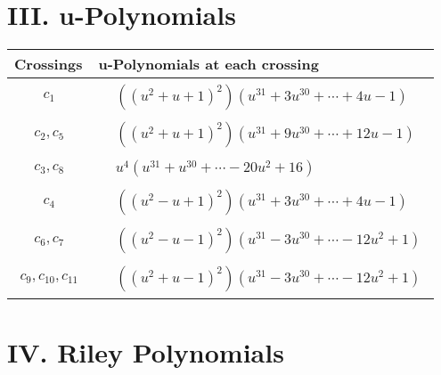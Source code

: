 \documentclass[1p]{elsarticle_modified}
\theoremstyle{definition}
\begin{document}
\newpage\renewcommand{\arraystretch}{1}
\centering \section*{ III. u-Polynomials}
\begin{tabular}{m{50pt}|m{274pt}}
Crossings & \hspace{64pt}u-Polynomials at each crossing \\
\hline $$\begin{aligned}c_{1}\end{aligned}$$&$\begin{aligned}
&((u^2+u+1)^2)(u^{31}+3 u^{30}+\cdots+4 u-1)
\end{aligned}$\\
\hline $$\begin{aligned}c_{2},c_{5}\end{aligned}$$&$\begin{aligned}
&((u^2+u+1)^2)(u^{31}+9 u^{30}+\cdots+12 u-1)
\end{aligned}$\\
\hline $$\begin{aligned}c_{3},c_{8}\end{aligned}$$&$\begin{aligned}
&u^4(u^{31}+u^{30}+\cdots-20 u^2+16)
\end{aligned}$\\
\hline $$\begin{aligned}c_{4}\end{aligned}$$&$\begin{aligned}
&((u^2- u+1)^2)(u^{31}+3 u^{30}+\cdots+4 u-1)
\end{aligned}$\\
\hline $$\begin{aligned}c_{6},c_{7}\end{aligned}$$&$\begin{aligned}
&((u^2- u-1)^2)(u^{31}-3 u^{30}+\cdots-12 u^2+1)
\end{aligned}$\\
\hline $$\begin{aligned}c_{9},c_{10},c_{11}\end{aligned}$$&$\begin{aligned}
&((u^2+u-1)^2)(u^{31}-3 u^{30}+\cdots-12 u^2+1)
\end{aligned}$\\
\hline
\end{tabular}\newpage\renewcommand{\arraystretch}{1}
\centering \section*{ IV. Riley Polynomials}
\end{document}
